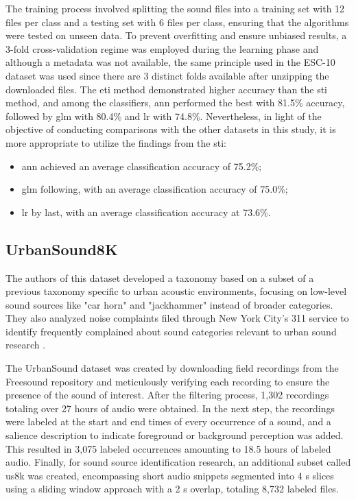 The training process involved splitting the sound files into a training set with 12 files per class and a testing set with 6 files per class, ensuring that the algorithms were tested on unseen data. To prevent overfitting and ensure unbiased results, a 3-fold cross-validation regime was employed during the learning phase and although a metadata was not available, the same principle used in the ESC-10 dataset was used since there are 3 distinct folds available after unzipping the downloaded files. The \gls{eti} method demonstrated higher accuracy than the \gls{sti} method, and among the classifiers, \gls{ann} performed the best with 81.5\% accuracy, followed by \gls{glm} with 80.4\% and \gls{lr} with 74.8\%. Nevertheless, in light of the objective of conducting comparisons with the other datasets in this study, it is more appropriate to utilize the findings from the \gls{sti}:

\begin{itemize}
    \item \gls{ann} achieved an average classification accuracy of  75.2\%;
    \item \gls{glm} following, with an average classification accuracy of 75.0\%;
    \item \gls{lr} by last, with an average classification accuracy at 73.6\%. 
\end{itemize}


\subsection{UrbanSound8K}
\label{subsec:dataset_US8K}

The authors of this dataset developed a taxonomy based on a subset of a previous taxonomy specific to urban acoustic environments, focusing on low-level sound sources like "car horn" and "jackhammer" instead of broader categories. They also analyzed noise complaints filed through New York City's 311 service to identify frequently complained about sound categories relevant to urban sound research \cite{Salamon2014}.

The UrbanSound dataset was created by downloading field recordings from the Freesound repository \cite{Font_freesound2013} and meticulously verifying each recording to ensure the presence of the sound of interest. After the filtering process, 1,302 recordings totaling over 27 hours of audio were obtained. In the next step, the recordings were labeled at the start and end times of every occurrence of a sound, and a salience description to indicate foreground or background perception was added. This resulted in 3,075 labeled occurrences amounting to 18.5 hours of labeled audio. Finally, for sound source identification research, an additional subset called \gls{us8k} was created, encompassing short audio snippets segmented into 4 \gls{s} slices using a sliding window approach with a 2 \gls{s} overlap, totaling 8,732 labeled files.

